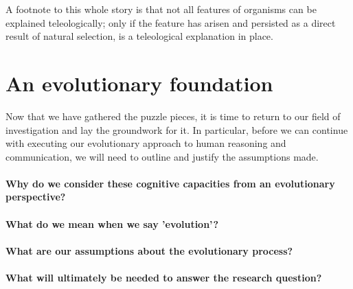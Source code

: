 A footnote to this whole story is that not all features of organisms can be explained teleologically; only if the feature has arisen and persisted as a direct result of natural selection, is a teleological explanation in place.

\section{An evolutionary foundation}

Now that we have gathered the puzzle pieces, it is time to return to our field of investigation and lay the groundwork for it. In particular, before we can continue with executing our evolutionary approach to human reasoning and communication, we will need to outline and justify the assumptions made.

\paragraph{Why do we consider these cognitive capacities from an evolutionary perspective?}

\paragraph{What do we mean when we say 'evolution'?}

\paragraph{What are our assumptions about the evolutionary process?}

\paragraph{What will ultimately be needed to answer the research question?}
